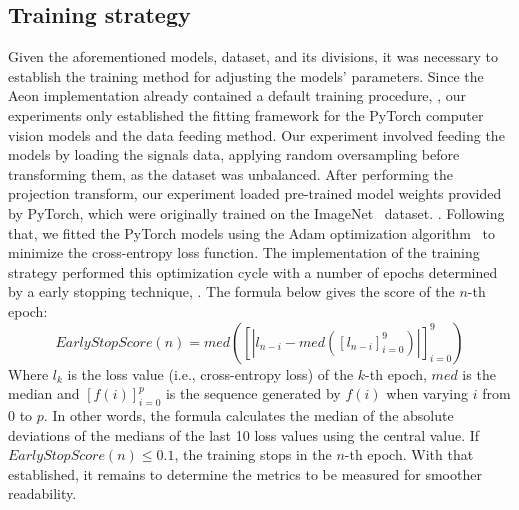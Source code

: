 



\subsection{Training strategy}

Given the aforementioned models, dataset, and its divisions, it was necessary to establish the training method for adjusting the models' parameters. Since the Aeon implementation already contained a default training procedure, , our experiments only established the fitting framework for the PyTorch computer vision models and the data feeding method. Our experiment involved feeding the models by loading the signals data, applying random oversampling before transforming them, as the dataset was unbalanced. After performing the projection transform, our experiment loaded pre-trained model weights provided by PyTorch, which were originally trained on the ImageNet~\cite{ImageNet} dataset. . Following that, we fitted the PyTorch models using the Adam optimization algorithm~\cite{Adam} to minimize the cross-entropy loss function.  The implementation of the training strategy performed this optimization cycle with a number of epochs determined by a  early stopping technique, . The formula below gives the score of the $n$-th epoch:
\begin{equation}
EarlyStopScore(n) = med([|l_{n-i} - med([l_{n-i}]_{i=0}^9)|]_{i=0}^{9})
\end{equation}
\noindent Where $l_k$ is the loss value (i.e., cross-entropy loss) of the $k$-th epoch, ${med}$ is the median and $[f(i)]_{i=0}^p$ is the sequence generated by $f(i)$ when varying $i$ from $0$ to $p$. In other words, the formula calculates the median of the absolute deviations of the medians of the last 10 loss values using the central value. If $EarlyStopScore(n) \leq 0.1$, the training stops in the $n$-th epoch. With that established, it remains to determine the metrics to be measured for smoother readability.

